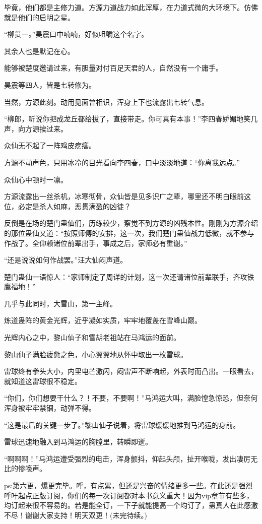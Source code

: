 \begin{this_body}
毕竟，他们都是主修力道。方源力道战力如此浑厚，在力道式微的大环境下。仿佛就是他们的启明之星。

“柳贯一。”昊震口中喃喃，好似咀嚼这个名字。

其余人也是默记在心。

能够被楚度邀请过来，有胆量对付百足天君的人，自然没有一个庸手。

昊震等四人，皆是七转修为。

当然，方源此刻。动用见面曾相识，浑身上下也流露出七转气息。

“柳郎，听说你把成龙丘都给拔了，直接带走。你可真有本事！”李四春娇媚地笑几声，向方源挨过来。

众仙无不起了一阵鸡皮疙瘩。

方源不动声色，只用冰冷的目光看向李四春，口中淡淡地道：“你离我远点。”

众仙心中顿时一凛。

方源流露出一丝杀机，冰寒彻骨，众仙皆是见多识广之辈，哪里还不明白眼前这位，必定是杀人如麻，恶贯满盈的凶徒？

反倒是在场的楚门蛊仙们，历练较少，察觉不到方源的凶残本性。刚刚为方源介绍的那位蛊仙又道：“按照师傅的安排，这一次，我们楚门蛊仙战力低微，就不参与作战了。全仰赖诸位前辈出手，事成之后，家师必有重谢。”

“还是说说如何作战罢。”汪大仙闷声道。

楚门蛊仙一语惊人：“家师制定了周详的计划，这一次还请诸位前辈联手，齐攻铁鹰福地！”

几乎与此同时，大雪山，第一主峰。

炼道蛊阵的黄金光辉，近乎凝如实质，牢牢地覆盖在雪峰山巅。

光辉内心之中，黎山仙子和雪胡老祖站在马鸿运的面前。

黎山仙子满脸疲惫之色，小心翼翼地从怀中取出一枚雷球。

雷球终有拳头大小，内里电芒激闪，闷雷声不断响起，外表时而凸出。一眼看去，就知道这雷球很不稳定。

“你们，你们想要干什么？！不要，不要啊！”马鸿运大叫，满脸惶急惊恐，但奈何浑身被牢牢禁锢，动弹不得。

“这是最后的关键一步了。”黎山仙子说着，将雷球缓缓地推到马鸿运的身前。

雷球迅速地融入到马鸿运的胸膛里，转瞬即逝。

“啊啊啊！”马鸿运遭受强烈的电击，浑身颤抖，仰起头颅，扯开喉咙，发出凄厉无比的惨嚎声。

ps:第六更，爆更完毕。呼，有点累，但还是兴奋的情绪更多一些。在此还是强烈呼吁起点正版订阅，你们的每一次订阅都对本书意义重大！因为vip章节有些多，均订起来很不容易的。若是能全订，一下子就能提高一个均订了，蛊真人在此感激不尽！谢谢大家支持！明天双更！(未完待续。)

\end{this_body}

